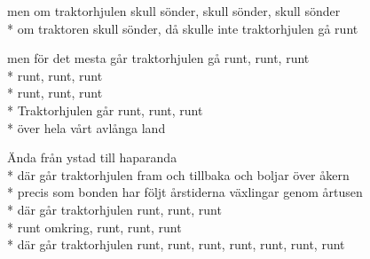 \begin{SongText}[Traktorhjulen]
\begin{SongVerse}
men om traktorhjulen skull sönder, skull sönder, skull sönder\\*%
om traktoren skull sönder, då skulle inte traktorhjulen gå runt
\end{SongVerse}
\begin{SongVerse}
men för det mesta går traktorhjulen gå runt, runt, runt\\*%
runt, runt, runt\\*%
runt, runt, runt\\*%
Traktorhjulen går runt, runt, runt\\*%
över hela vårt avlånga land
\end{SongVerse}
\begin{SongVerse}
Ända från ystad till haparanda\\*%
där går traktorhjulen fram och tillbaka och boljar över åkern\\*%
precis som bonden har följt årstiderna växlingar genom årtusen\\*%
där går traktorhjulen runt, runt, runt\\*%
runt omkring, runt, runt, runt\\*%
där går traktorhjulen runt, runt, runt, runt, runt, runt, runt
\end{SongVerse}
\end{SongText}
